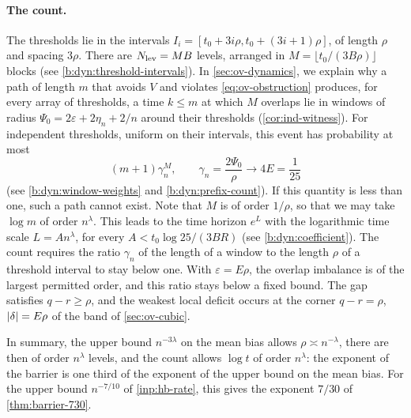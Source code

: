 \paragraph{The count.} The thresholds lie in the intervals
$I_i=[t_0+3i\rho,t_0+(3i+1)\rho]$, of length $\rho$ and spacing $3\rho$. There
are $N_{\rm lev}=MB$ levels, arranged in $M=\lfloor t_0/(3B\rho)\rfloor$
blocks (see \eqref{b:dyn:threshold-intervals}). In \cref{sec:ov-dynamics}, we
explain why a path of length $m$ that avoids $V$ and violates
\eqref{eq:ov-obstruction} produces, for every array of thresholds, a time
$k\le m$ at which $M$ overlaps lie in windows of radius
$\Psi_0=2\varepsilon+2\eta_n+2/n$ around their thresholds
(\cref{cor:ind-witness}). For independent thresholds, uniform on their
intervals, this event has probability at most
\begin{equation}\label{eq:ov-count}
 (m+1)\gamma_n^M,\qquad
 \gamma_n=\frac{2\Psi_0}\rho\longrightarrow4E=\frac1{25}
\end{equation}
(see \eqref{b:dyn:window-weights} and \eqref{b:dyn:prefix-count}). If this quantity
is less than one, such a path cannot exist. Note that $M$ is of order
$1/\rho$, so that we may take $\log m$ of order $n^\lambda$. This leads to the
time horizon $e^L$ with the logarithmic time scale $L=An^\lambda$, for every
$A<t_0\log25/(3BR)$ (see \eqref{b:dyn:coefficient}). The count requires the
ratio $\gamma_n$ of the length of a window to the length $\rho$ of a threshold
interval to stay below one. With $\varepsilon=E\rho$, the overlap
imbalance is of the largest permitted order, and this ratio stays below a
fixed bound. The gap satisfies $q-r\ge\rho$, and the weakest local deficit
occurs at the corner $q-r=\rho$, $\lvert \delta\rvert=E\rho$ of the band of
\cref{sec:ov-cubic}.

In summary, the upper bound $n^{-3\lambda}$ on the mean bias allows
$\rho\asymp n^{-\lambda}$, there are then of order $n^\lambda$ levels, and the
count allows $\log t$ of order $n^\lambda$: the exponent of the barrier is one
third of the exponent of the upper bound on the mean bias. For the upper bound
$n^{-7/10}$ of \cref{inp:hb-rate}, this gives the exponent $7/30$ of
\cref{thm:barrier-730}.

